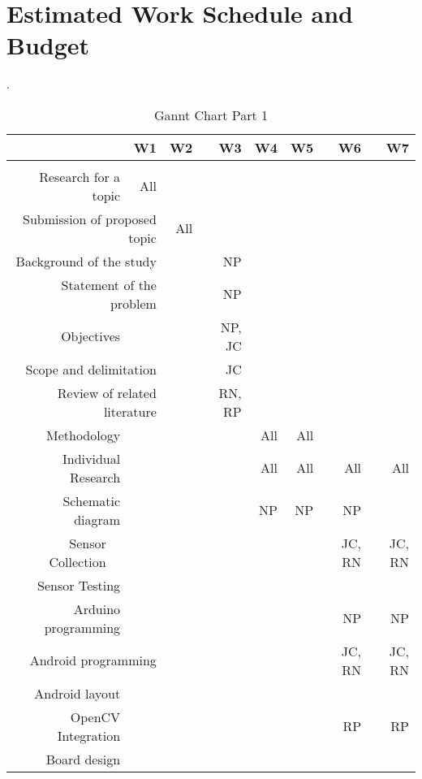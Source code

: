 \section{Estimated Work Schedule and Budget}
.\\

\begin{table}[htp]
  \centering
  \caption{Gannt Chart Part 1}
    \begin{tabular}{rrrrrrrrr}
    \toprule
      &   & W1 & W2 & W3 & W4 & W5 & W6 & W7 \\
    \midrule
      &   &   &   &   &   &   &   &  \\
    \multicolumn{2}{r}{Research for a topic} & All &   &   &   &   &   &  \\
    \multicolumn{3}{r}{Submission of proposed topic} & All &   &   &   &   &  \\
    \multicolumn{3}{r}{Background of the study} &   & NP &   &   &   &  \\
    \multicolumn{3}{r}{Statement of the problem} &   & NP &   &   &   &  \\
    \multicolumn{2}{r}{Objectives} &   &   & NP, JC &   &   &   &  \\
    \multicolumn{3}{r}{Scope and delimitation} &   & JC &   &   &   &  \\
    \multicolumn{3}{r}{Review of related literature} &   & RN, RP &   &   &   &  \\
    \multicolumn{2}{r}{Methodology} &   &   &   & All & All &   &  \\
    \multicolumn{2}{r}{Individual Research} &   &   &   & All & All & All & All \\
    \multicolumn{2}{r}{Schematic diagram} &   &   &   & NP & NP & NP &  \\
    Sensor Collection &   &   &   &   &   &   & JC, RN & JC, RN \\
    \multicolumn{2}{r}{Sensor Testing} &   &   &   &   &   &   &  \\
    \multicolumn{2}{r}{Arduino programming} &   &   &   &   &   & NP & NP \\
    \multicolumn{3}{r}{Android programming} &   &   &   &   & JC, RN & JC, RN \\
    \multicolumn{2}{r}{Android layout} &   &   &   &   &   &   &  \\
    \multicolumn{2}{r}{OpenCV Integration} &   &   &   &   &   & RP & RP \\
    \multicolumn{2}{r}{Board design} &   &   &   &   &   &   &  \\

\end{tabular}
\end{table}
